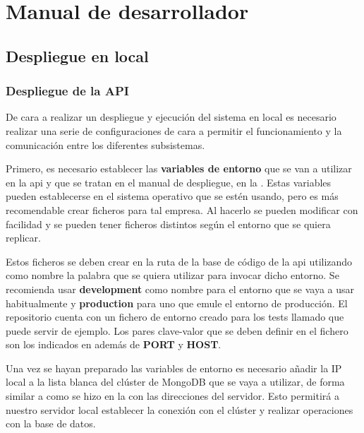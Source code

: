 \chapter{Manual de desarrollador}
\label{ch:manual_desarrollador}

\section{Despliegue en local}

\subsection{Despliegue de la API}
\label{ssec:despliegue_local_api}

De cara a realizar un despliegue y ejecución del sistema en local es necesario realizar una serie de configuraciones de cara a permitir el funcionamiento y la comunicación entre los diferentes subsistemas.

Primero, es necesario establecer las \textbf{variables de entorno} que se van a utilizar en la \acrshort{api} y que se tratan en el manual de despliegue, en la . Estas variables pueden establecerse en el sistema operativo que se estén usando, pero es más recomendable crear ficheros  para tal empresa. Al hacerlo se pueden modificar con facilidad y se pueden tener ficheros distintos según el entorno que se quiera replicar.

Estos ficheros se deben crear en la ruta  de la base de código de la \acrshort{api} utilizando como nombre la palabra que se quiera utilizar para invocar dicho entorno. Se recomienda usar \textbf{development} como nombre para el entorno que se vaya a usar habitualmente y \textbf{production} para uno que emule el entorno de producción. El repositorio cuenta con un fichero de entorno creado para los tests llamado  que puede servir de ejemplo. Los pares clave-valor que se deben definir en el fichero son los indicados en  además de \textbf{PORT} y \textbf{HOST}.

Una vez se hayan preparado las variables de entorno es necesario añadir la IP local a la lista blanca del clúster de MongoDB que se vaya a utilizar, de forma similar a como se hizo en la  con las direcciones del servidor. Esto permitirá a nuestro servidor local establecer la conexión con el clúster y realizar operaciones con la base de datos.


